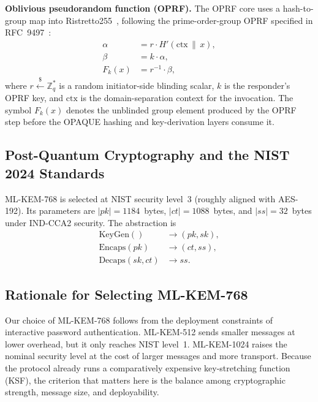 \documentclass{ieeeijc}
\theoremstyle{remark}
\begin{document}
\textbf{Oblivious pseudorandom function (OPRF).} The OPRF core uses a
hash-to-group map into Ristretto255~\cite{devalence2024}, following the
prime-order-group OPRF specified in RFC~9497~\cite{rfc9497}:
\begin{equation}
  \begin{aligned}
    \alpha &= r \cdot H'(\mathrm{ctx} \,\|\, x),\\
    \beta &= k \cdot \alpha,\\
    F_k(x) &= r^{-1} \cdot \beta,
  \end{aligned}
\end{equation}
where $r \xleftarrow{\$} \mathbb{Z}_q^*$ is a random initiator-side
blinding scalar, $k$ is the responder's OPRF key, and $\mathrm{ctx}$ is
the domain-separation context for the invocation. The symbol $F_k(x)$ denotes
the unblinded group element produced by the OPRF step before the OPAQUE
hashing and key-derivation layers consume it.

\subsection{Post-Quantum Cryptography and the NIST 2024 Standards}

ML-KEM-768 is selected at NIST security level~3 (roughly aligned with
AES-192). Its parameters are $|pk| = 1184$~bytes,
$|ct| = 1088$~bytes, and $|ss| = 32$~bytes under IND-CCA2 security.
The abstraction is
\begin{equation}
  \begin{aligned}
    \mathrm{KeyGen}() &\to (pk, sk),\\
    \mathrm{Encaps}(pk) &\to (ct, ss),\\
    \mathrm{Decaps}(sk, ct) &\to ss.
  \end{aligned}
\end{equation}

\subsection{Rationale for Selecting ML-KEM-768}

Our choice of ML-KEM-768 follows from the deployment constraints of
interactive password authentication. ML-KEM-512 sends smaller messages
at lower overhead, but it only reaches NIST level~1. ML-KEM-1024 raises
the nominal security level at the cost of larger messages and more
transport. Because the protocol already runs a comparatively expensive
key-stretching function (KSF), the criterion that matters here is the balance among cryptographic
strength, message size, and deployability.
\end{document}
